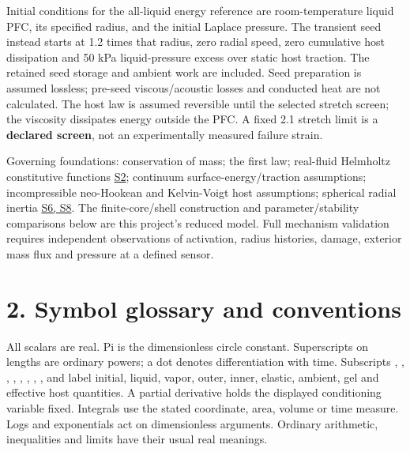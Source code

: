 \documentclass[10pt,a4paper]{article}
\begin{document}
Initial conditions for the all-liquid energy reference are room-temperature liquid PFC, its specified radius, and the initial Laplace pressure. The transient seed instead starts at 1.2 times that radius, zero radial speed, zero cumulative host dissipation and 50 kPa liquid-pressure excess over static host traction. The retained seed storage and ambient work are included. Seed preparation is assumed lossless; pre-seed viscous/acoustic losses and conducted heat are not calculated. The host law is assumed reversible until the selected stretch screen; the viscosity dissipates energy outside the PFC. A fixed 2.1 stretch limit is a \textbf{declared screen}, not an experimentally measured failure strain.

Governing foundations: conservation of mass; the first law; real-fluid Helmholtz constitutive functions \href{../../SOURCES.md}{S2}; continuum surface-energy/traction assumptions; incompressible neo-Hookean and Kelvin-Voigt host assumptions; spherical radial inertia \href{../../SOURCES.md}{S6, S8}. The finite-core/shell construction and parameter/stability comparisons below are this project's reduced model. Full mechanism validation requires independent observations of activation, radius histories, damage, exterior mass flux and pressure at a defined sensor.

\section*{2. Symbol glossary and conventions}
All scalars are real. Pi is the dimensionless circle constant. Superscripts on lengths are ordinary powers; a dot denotes differentiation with time. Subscripts , , , , , , , , and  label initial, liquid, vapor, outer, inner, elastic, ambient, gel and effective host quantities. A partial derivative holds the displayed conditioning variable fixed. Integrals use the stated coordinate, area, volume or time measure. Logs and exponentials act on dimensionless arguments. Ordinary arithmetic, inequalities and limits have their usual real meanings.
\end{document}
